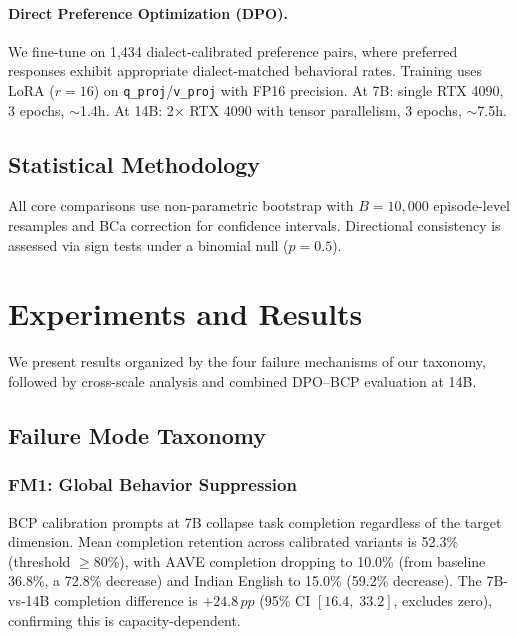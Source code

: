 \documentclass[11pt,a4paper]{article}
\newcommand{\fm}[1]{\textbf{FM#1}}
\newcommand{\pp}{\,pp}
\newcommand{\ci}[2]{[#1,\;#2]}
\begin{document}
\paragraph{Direct Preference Optimization (DPO).}
We fine-tune on 1,434 dialect-calibrated preference pairs, where preferred responses exhibit appropriate dialect-matched behavioral rates.
Training uses LoRA ($r{=}16$) on \texttt{q\_proj}/\texttt{v\_proj} with FP16 precision.
At 7B: single RTX 4090, 3 epochs, $\sim$1.4h.
At 14B: 2$\times$ RTX 4090 with tensor parallelism, 3 epochs, $\sim$7.5h.

\subsection{Statistical Methodology}

All core comparisons use non-parametric bootstrap with $B{=}10{,}000$ episode-level resamples and BCa correction for confidence intervals.
Directional consistency is assessed via sign tests under a binomial null ($p{=}0.5$).

\section{Experiments and Results}
\label{sec:experiments}

We present results organized by the four failure mechanisms of our taxonomy, followed by cross-scale analysis and combined DPO--BCP evaluation at 14B.

\subsection{Failure Mode Taxonomy}

\subsubsection{\fm{1}: Global Behavior Suppression}
\label{sec:fm1}

BCP calibration prompts at 7B collapse task completion regardless of the target dimension.
Mean completion retention across calibrated variants is 52.3\% (threshold $\geq$80\%), with AAVE completion dropping to 10.0\% (from baseline 36.8\%, a 72.8\% decrease) and Indian English to 15.0\% (59.2\% decrease).
The 7B-vs-14B completion difference is $+24.8\pp$ (95\% CI $\ci{16.4}{33.2}$, excludes zero), confirming this is capacity-dependent.
\end{document}
